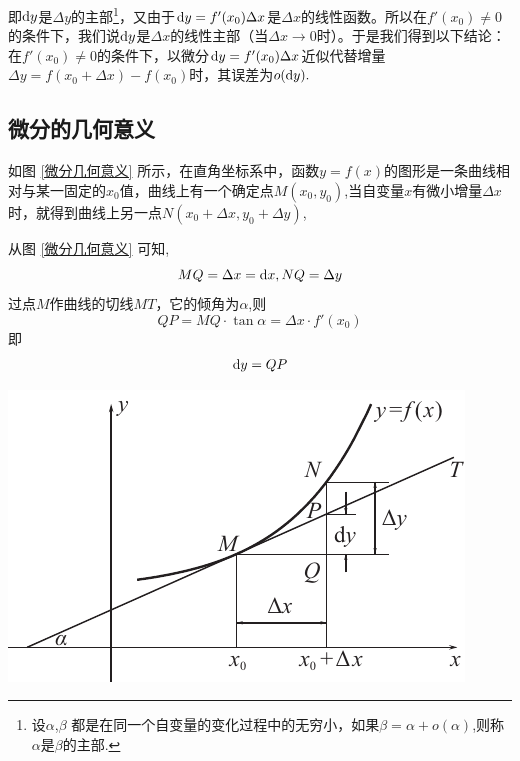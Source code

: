 即${\rm{d}} y$是$\Delta y $的主部\footnote{设$\alpha$,$ \beta$ 都是在同一个自变量的变化过程中的无穷小，如果$\beta=\alpha +o(\alpha)$,则称$\alpha$是$\beta$的主部.}，又由于${\rm{d}} y=f'(x_0)\Delta x$是$\Delta x$的线性函数。所以在$f'(x_0)\neq0$的条件下，我们说${\rm{d}} y$是$\Delta x$的线性主部（当$\Delta x\to 0$时）。于是我们得到以下结论：
\\  \kg 在$f'(x_0)\neq0$的条件下，以微分${\rm{d}} y=f'(x_0)\Delta x$近似代替增量$\Delta y=f(x_0+\Delta x)-f(x_0)$时，其误差为$o({\rm{d}} y).$
\subsection{微分的几何意义}
如图 \ref{微分几何意义} 所示，在直角坐标系中，函数$y=f(x)$的图形是一条曲线相对与某一固定的$x_0$值，曲线上有一个确定点$M(x_0,y_0)$,当自变量$x$有微小增量$\Delta x$时，就得到曲线上另一点$N(x_0+\Delta x,y_0+\Delta y)$,

\noindent
\begin{minipage}{0.45\linewidth}
\qquad 从图 \ref{微分几何意义} 可知,
	\begin{equation}
	\nonumber
	MQ=\Delta x={\rm{d}} x,NQ=\Delta y
\end{equation}
过点$M$作曲线的切线$MT$，它的倾角为$\alpha$,则
\begin{equation}
	\nonumber
	QP=MQ\cdot \tan\alpha=\Delta x\cdot f'(x_0)
\end{equation}
即
\begin{equation}
	\nonumber
	{\rm{d}} y=QP
\end{equation}
\end{minipage}
\begin{minipage}{0.55\linewidth}
	\centering
	\includegraphics[width = 0.8\linewidth]{pic/C-2/微分几何意义.pdf}
	\vspace*{-1em}
	\label{微分几何意义}
\end{minipage}
\vspace*{1.5em}

